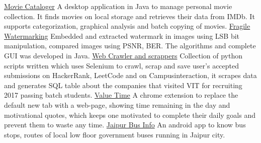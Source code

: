 \vspace{-2.6mm}
\begin{cvprojectentries}
\vspace{-1mm}
  \cvprojectentry
    {\href{https://shubhammathur.me/MovieCataloger}{\color{darkred}Movie Cataloger}}
    {\small A desktop application in Java to manage personal movie collection. It finds movies on local storage and retrieves their data from IMDb. It supports categorization, graphical analysis and batch copying of movies.
    }
    \newline
  \cvprojectentry    
    {\href{https://shubhammathur.me/FragileWatermarking}{\color{darkred}Fragile Watermarking}}
    {\small Embedded and extracted watermark in images using LSB bit manipulation, compared images using PSNR, BER. The algorithms and complete GUI was developed in Java.
    }
    \newline
  \cvprojectentry    
    {\href{https://shubhammathur.me/PythonScripts}{\color{darkred}Web Crawler and scrappers}}
    {\small Collection of python scripts written which uses Selenium to crawl, scrap and save user's accepted submissions on HackerRank, LeetCode and on Campusinteraction, it scrapes data and generates SQL table about the companies that visited VIT for recruiting 2017 passing batch students.
    }
    \newline
  \cvprojectentry    
    {\href{https://shubhammathur.me/Value-Time}{\color{darkred}Value Time}}
    {\small A chrome extension to replace the default new tab with a web-page, showing time remaining in the day and motivational quotes, which keeps one motivated to complete their daily goals and prevent them to waste any time.
    }
    \newline
  \cvprojectentry    
    {\href{https://github.com/googleknight/jaipur-bus-app}{\color{darkred}Jaipur Bus Info}}
    {\small An android app to know bus stops, routes of local low floor government buses running in Jaipur city.
    }    
\end{cvprojectentries}
